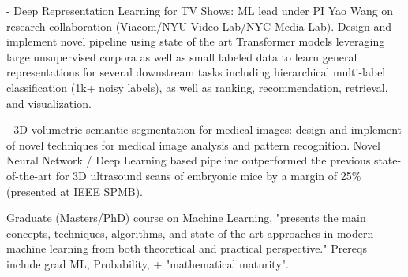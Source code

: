 \documentclass[]{deedy-resume-openfont}
\begin{document}
\begin{minipage}[t]{0.58\textwidth}

- Deep Representation Learning for TV Shows: ML lead under PI Yao Wang on research collaboration (Viacom/NYU Video Lab/NYC Media Lab). Design and implement novel pipeline using state of the art Transformer models leveraging large unsupervised corpora as well as small labeled data to learn general representations for several downstream tasks including hierarchical multi-label classification (1k+ noisy labels), as well as ranking, recommendation, retrieval, and visualization.



- 3D volumetric semantic segmentation for medical images:  design and implement of novel techniques for medical image analysis and pattern recognition. Novel Neural Network / Deep Learning based pipeline outperformed the previous state-of-the-art for 3D ultrasound scans of embryonic mice by a margin of 25\% (presented at IEEE SPMB).


\sectionseplg


Graduate (Masters/PhD) course on Machine Learning, "presents the main concepts, techniques, algorithms, and state-of-the-art approaches in modern machine learning from both theoretical and practical perspective." Prereqs include grad ML, Probability, + "mathematical maturity".

\sectionseplg



 \newline


\end{minipage}
\end{document}
